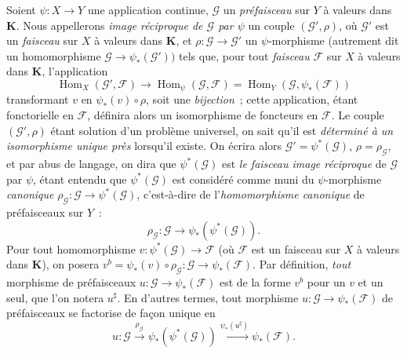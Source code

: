 \begin{env}[3.5.3]
\label{0.3.5.3-fr}
Soient $\psi:X\to Y$ une application continue, $\mathcal{G}$ un
\emph{préfaisceau} sur $Y$ à valeurs dans $\mathbf{K}$. Nous appellerons
\emph{image réciproque de $\mathcal{G}$ par $\psi$} un couple
$(\mathcal{G}',\rho)$, où $\mathcal{G}'$ est un \emph{faisceau} sur $X$ à
valeurs dans $\mathbf{K}$, et
$\rho:\mathcal{G}\to\mathcal{G}'$ un $\psi$-morphisme (autrement dit un
homomorphisme $\mathcal{G}\to\psi_*(\mathcal{G}'))$ tels que, pour tout
\emph{faisceau} $\mathcal{F}$ sur $X$ à valeurs dans $\mathbf{K}$,
l'application
\begin{equation*}
  \operatorname{Hom}_X(\mathcal{G}',\mathcal{F})
  \longrightarrow \operatorname{Hom}_\psi(\mathcal{G},\mathcal{F})
  =\operatorname{Hom}_Y(\mathcal{G},\psi_*(\mathcal{F}))
\tag{3.5.3.1}\label{0.3.5.3.1-fr}
\end{equation*}
transformant $v$ en $\psi_*(v)\circ\rho$, soit une \emph{bijection}~; cette
application, étant fonctorielle en $\mathcal{F}$, définira alors un
isomorphisme de foncteurs en $\mathcal{F}$. Le couple
$(\mathcal{G}',\rho)$ étant solution d'un problème universel, on sait qu'il
est \emph{déterminé à un isomorphisme unique près} lorsqu'il existe. On écrira
alors $\mathcal{G}'=\psi^*(\mathcal{G})$, $\rho=\rho_{\mathcal{G}}$, et par
abus de langage, on dira que $\psi^*(\mathcal{G})$ est \emph{le faisceau image
réciproque} de $\mathcal{G}$ par $\psi$, étant entendu que
$\psi^*(\mathcal{G})$ est considéré comme muni du $\psi$-morphisme
\emph{canonique}
$\rho_{\mathcal{G}}:\mathcal{G}\to\psi^*(\mathcal{G})$, c'est-à-dire de
l'\emph{homomorphisme canonique} de préfaisceaux sur $Y$~:
\begin{equation*}
  \rho_{\mathcal{G}}:\mathcal{G}\to\psi_*(\psi^*(\mathcal{G})).
\tag{3.5.3.2}\label{0.3.5.3.2-fr}
\end{equation*}
Pour tout homomorphisme
$v:\psi^*(\mathcal{G})\to\mathcal{F}$ (où $\mathcal{F}$ est un faisceau sur
$X$ à valeurs dans $\mathbf{K}$), on posera
$v^b=\psi_*(v)\circ\rho_{\mathcal{G}}:
\mathcal{G}\to\psi_*(\mathcal{F})$. Par définition, \emph{tout} morphisme de
préfaisceaux $u:\mathcal{G}\to\psi_*(\mathcal{F})$ est de la forme $v^b$ pour
un $v$ et un seul, que l'on notera $u^\sharp$. En d'autres termes, tout
morphisme $u:\mathcal{G}\to\psi_*(\mathcal{F})$ de préfaisceaux se factorise
de façon unique en
\begin{equation*}
  u:\mathcal{G}\xrightarrow{\rho_{\mathcal{G}}}
  \psi_*(\psi^*(\mathcal{G}))
  \xrightarrow{\psi_*(u^\sharp)}\psi_*(\mathcal{F}).
\tag{3.5.3.3}\label{0.3.5.3.3-fr}
\end{equation*}
\end{env}

